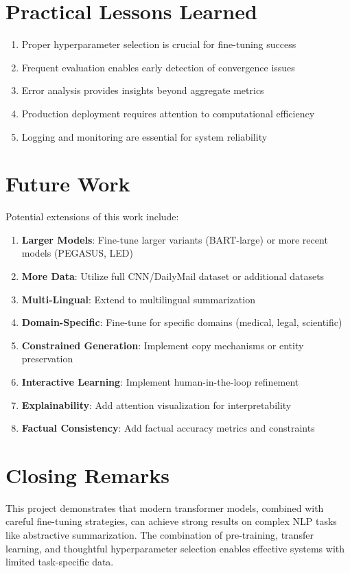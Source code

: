 \documentclass[12pt,a4paper,oneside]{report}
\begin{document}
\section{Practical Lessons Learned}
\begin{enumerate}
    \item Proper hyperparameter selection is crucial for fine-tuning success
    \item Frequent evaluation enables early detection of convergence issues
    \item Error analysis provides insights beyond aggregate metrics
    \item Production deployment requires attention to computational efficiency
    \item Logging and monitoring are essential for system reliability
\end{enumerate}

\section{Future Work}
Potential extensions of this work include:

\begin{enumerate}
    \item \textbf{Larger Models}: Fine-tune larger variants (BART-large) or more recent models (PEGASUS, LED)
    \item \textbf{More Data}: Utilize full CNN/DailyMail dataset or additional datasets
    \item \textbf{Multi-Lingual}: Extend to multilingual summarization
    \item \textbf{Domain-Specific}: Fine-tune for specific domains (medical, legal, scientific)
    \item \textbf{Constrained Generation}: Implement copy mechanisms or entity preservation
    \item \textbf{Interactive Learning}: Implement human-in-the-loop refinement
    \item \textbf{Explainability}: Add attention visualization for interpretability
    \item \textbf{Factual Consistency}: Add factual accuracy metrics and constraints
\end{enumerate}

\section{Closing Remarks}
This project demonstrates that modern transformer models, combined with careful fine-tuning strategies, can achieve strong results on complex NLP tasks like abstractive summarization. The combination of pre-training, transfer learning, and thoughtful hyperparameter selection enables effective systems with limited task-specific data.
\end{document}
